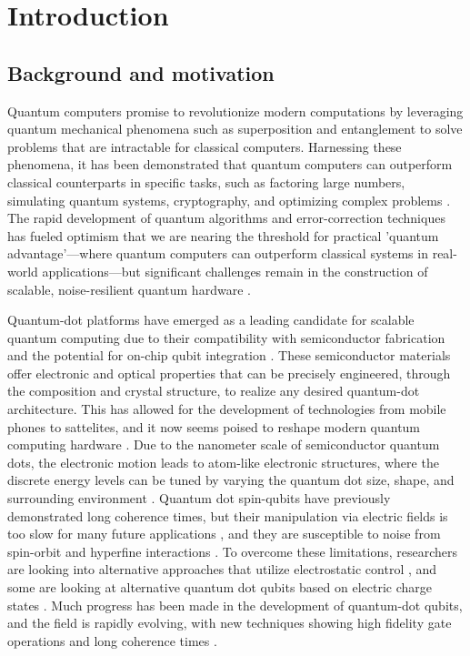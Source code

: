 \documentclass{subfiles}
\begin{document}
\chapter{Introduction}
\section{Background and motivation}
Quantum computers promise to revolutionize modern computations by leveraging quantum mechanical phenomena such as superposition and entanglement to solve problems that are intractable for classical computers. Harnessing these phenomena, it has been demonstrated that quantum computers can outperform classical counterparts in specific tasks, such as factoring large numbers, simulating quantum systems, cryptography, and optimizing complex problems \cite{shor1999polynomial, shor1996fault, gisin2002quantum, grover1996fast}. The rapid development of quantum algorithms and error-correction techniques has fueled optimism that we are nearing the threshold for practical 'quantum advantage'—where quantum computers can outperform classical systems in real-world applications—but significant challenges remain in the construction of scalable, noise-resilient quantum hardware  \cite{daley2022practical, lau2022nisq,}.

Quantum-dot platforms have emerged as a leading candidate for scalable quantum computing due to their compatibility with semiconductor fabrication and the potential for on-chip qubit integration \cite{burkard1999coupled, loss1998quantum}. These semiconductor materials offer electronic and optical properties that can be precisely engineered, through the composition and crystal structure, to realize any desired quantum-dot architecture. This has allowed for the development of technologies from mobile phones to sattelites, and it now seems poised to reshape modern quantum computing hardware \cite{garcia2021semiconductor, zhang2018qubits}. Due to the nanometer scale of semiconductor quantum dots, the electronic motion leads to atom-like electronic structures, where the discrete energy levels can be tuned by varying the quantum dot size, shape, and surrounding environment \cite{terna2021future}. Quantum dot spin-qubits have previously demonstrated long coherence times, but their manipulation via electric fields is too slow for many future applications \cite{stano2022review}, and they are susceptible to noise from spin-orbit and hyperfine interactions \cite{kuhlmann2013charge, yoneda2018quantum}. To overcome these limitations, researchers are looking into alternative approaches that utilize electrostatic control \cite{veldhorst2014addressable, weber2012engineering}, and some are looking at alternative quantum dot qubits based on electric charge states \cite{gorman2005charge, kim2015microwave}. Much progress has been made in the development of quantum-dot qubits, and the field is rapidly evolving, with new techniques showing high fidelity gate operations and long coherence times \cite{garcia2021semiconductor}.
\end{document}
